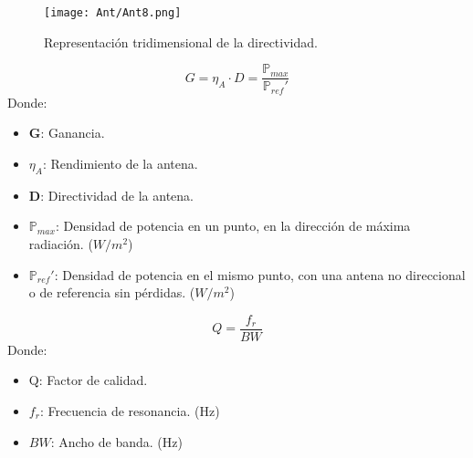 \documentclass[
	12pt, %
	fleqn, %
	a4paper, %
	oneside, %
]{LegrandOrangeBook}
\begin{document}
\begin{figure}[H]
\centering
\texttt{[image: Ant/Ant8.png]}
\caption{Representación tridimensional de la directividad.}
\end{figure}
\begin{definition}
\begin{equation}
G=\eta_A\cdot D=\frac{\mathbb{P}_{max}}{\mathbb{P}_{ref}'}
\label{eq:ganancia}
\end{equation}
Donde:
\begin{itemize}
\item \textbf{G}: Ganancia.
\item $\eta_A$: Rendimiento de la antena.
\item \textbf{D}: Directividad de la antena.
\item $\mathbb{P}_{max}$: Densidad de potencia en un punto, en la dirección de máxima radiación. ($W/m^2$)
\item $\mathbb{P}_{ref}'$: Densidad de potencia en el mismo punto, con una antena no direccional o de referencia sin pérdidas. ($W/m^2$)
\end{itemize}
\end{definition}
\begin{definition}
\begin{equation}
Q=\frac{f_r}{BW}
\label{eq:factor de calidad}
\end{equation}
Donde:
\begin{itemize}
\item Q: Factor de calidad.
\item $f_r$: Frecuencia de resonancia. (Hz)
\item $BW$: Ancho de banda. (Hz)
\end{itemize}
\end{definition}
\end{document}
